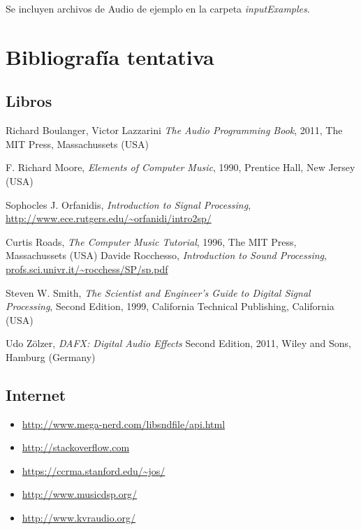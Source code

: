 \documentclass[a4paper,spanish,12pt]{article}
\begin{document}
Se incluyen archivos de Audio de ejemplo en la carpeta \textit{inputExamples}.

\newpage

\section{Bibliografía tentativa}
\subsection{Libros}
\begin{thebibliography}{9}
  Richard Boulanger, Victor Lazzarini
  \emph{The Audio Programming Book},
  2011, The MIT Press, Massachussets (USA)
 
  F. Richard Moore,
  \emph{Elements of Computer Music},
  1990, Prentice Hall, New Jersey (USA)

  Sophocles J. Orfanidis,
  \emph{Introduction to Signal Processing},
  \url{http://www.ece.rutgers.edu/~orfanidi/intro2sp/}
  
  Curtis Roads,
  \emph{The Computer Music Tutorial},
  1996, The MIT Press, Massachussets (USA)
  Davide Rocchesso,
  \emph{Introduction to Sound Processing},
  \url{profs.sci.univr.it/~rocchess/SP/sp.pdf}
  
  Steven W. Smith,
  \emph{The Scientist and Engineer's Guide to Digital Signal Processing},
  Second Edition, 1999, California Technical Publishing, California (USA)
  
  Udo Zölzer,
  \emph{DAFX: Digital Audio Effects}
  Second Edition, 2011, Wiley and Sons, Hamburg (Germany)
\end{thebibliography}
  
\subsection{Internet}

\begin{itemize}
\item \url{http://www.mega-nerd.com/libsndfile/api.html}
\item \url{http://stackoverflow.com}
\item \url{https://ccrma.stanford.edu/~jos/}
\item \url{http://www.musicdsp.org/}
\item \url{http://www.kvraudio.org/}
\end{itemize}
\end{document}
